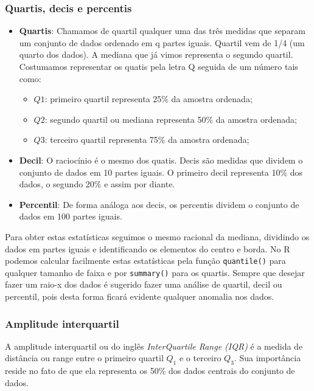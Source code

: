 \documentclass[11pt,]{style/krantz}
\providecommand{\tightlist}{%
  \setlength{\itemsep}{0pt}\setlength{\parskip}{0pt}}
\theoremstyle{definition}
\theoremstyle{definition}
\theoremstyle{definition}
\theoremstyle{remark}
\begin{document}
\hypertarget{quartis-decis-e-percentis}{%
\subsubsection{Quartis, decis e percentis}\label{quartis-decis-e-percentis}}

\begin{itemize}
\item
  \textbf{Quartis}: Chamamos de quartil qualquer uma das três medidas que separam um conjunto de dados ordenado em q partes iguais. Quartil vem de 1/4 (um quarto dos dados). A mediana que já vimos representa o segundo quartil. Costumamos representar os quatis pela letra Q seguida de um número tais como:

  \begin{itemize}
  \tightlist
  \item
    \(Q1\): primeiro quartil representa 25\% da amostra ordenada;
  \item
    \(Q2\): segundo quartil ou mediana representa 50\% da amostra ordenada;
  \item
    \(Q3\): terceiro quartil representa 75\% da amostra ordenada;
  \end{itemize}
\item
  \textbf{Decil}: O raciocínio é o mesmo dos quatis. Decis são medidas que dividem o conjunto de dados em 10 partes iguais. O primeiro decil representa 10\% dos dados, o segundo 20\% e assim por diante.
\item
  \textbf{Percentil}: De forma análoga aos decis, os percentis dividem o conjunto de dados em 100 partes iguais.
\end{itemize}

Para obter estas estatísticas seguimos o mesmo racional da mediana, dividindo os dados em partes iguais e identificando os elementos do centro e borda. No R podemos calcular facilmente estas estatísticas pela função \texttt{quantile()} para qualquer tamanho de faixa e por \texttt{summary()} para os quartis. Sempre que desejar fazer um raio-x dos dados é sugerido fazer uma análise de quartil, decil ou percentil, pois desta forma ficará evidente qualquer anomalia nos dados.

\hypertarget{amplitude-interquartil}{%
\subsubsection{Amplitude interquartil}\label{amplitude-interquartil}}

A amplitude interquartil ou do inglês \emph{InterQuartile Range (IQR)} é a medida de distância ou range entre o primeiro quartil \(Q_1\) e o terceiro \(Q_3\). Sua importância reside no fato de que ela representa os 50\% dos dados centrais do conjunto de dados.
\end{document}
